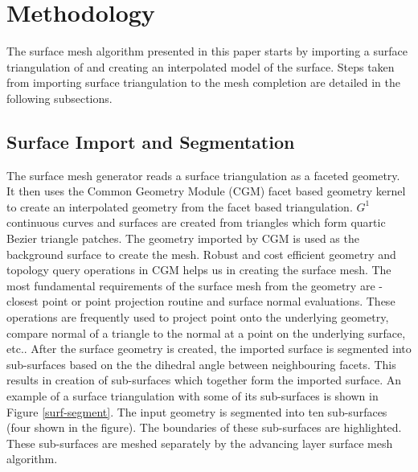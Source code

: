 \documentclass[conf]{new-aiaa}
\begin{document}

\section{Methodology}

The surface mesh algorithm presented in this paper starts by importing a surface triangulation of and creating an interpolated model of the surface. Steps taken from importing surface triangulation to the mesh completion are detailed in the following subsections.

\subsection{Surface Import and Segmentation}

The surface mesh generator reads a surface triangulation as a faceted geometry. It then uses the Common Geometry Module (CGM)\cite{tautges2004common} facet based geometry kernel to create an interpolated geometry from the facet based triangulation. $G^1$ continuous curves and surfaces are created from triangles which form quartic Bezier triangle patches. The geometry imported by CGM is used as the background surface to create the mesh. Robust and cost efficient geometry and topology query operations in CGM helps us in creating the surface mesh. The most fundamental requirements of the surface mesh from the geometry are - closest point or point projection routine and surface normal evaluations. These operations are frequently used to project point onto the underlying geometry, compare normal of a triangle to the normal at a point on the underlying surface, etc.. After the surface geometry is created, the imported surface is segmented into sub-surfaces based on the the dihedral angle between neighbouring facets. This results in creation of sub-surfaces which together form the imported surface. An example of a surface triangulation with some of its sub-surfaces is shown in Figure \ref{surf-segment}. The input geometry is segmented into ten sub-surfaces (four shown in the figure). The boundaries of these sub-surfaces are highlighted. These sub-surfaces are meshed separately by the advancing layer surface mesh algorithm.

\end{document}
